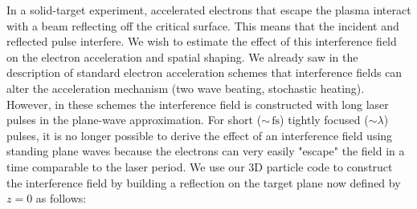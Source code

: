 In a solid-target experiment, accelerated electrons that escape the plasma interact with a beam reflecting off the critical surface. This means that the incident and reflected pulse interfere. We wish to estimate the effect of this interference field on the electron acceleration and spatial shaping. We already saw in the description of standard electron acceleration schemes that interference fields can alter the acceleration mechanism (two wave beating, stochastic heating). However, in these schemes the interference field is constructed with long laser pulses in the plane-wave approximation. For short ($\sim \,\mathrm{fs}$) tightly focused ($\sim \lambda$) pulses, it is no longer possible to derive the effect of an interference field using standing plane waves because the electrons can very easily "escape" the field in a time comparable to the laser period. 
We use our 3D particle code to construct the interference field by building a reflection on the target plane now defined by $z=0$ as follows:\\
